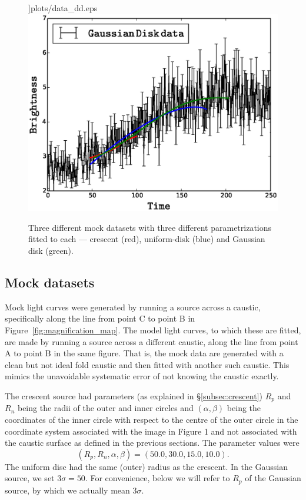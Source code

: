 \begin{figure}
                ]{plots/data_dd.eps}
\includegraphics[width=0.9\hsize,bb=0 0 576 432
                ]{plots/data_gg.eps}
\caption{\label{fig:mockdata} Three different mock datasets with
  three different parametrizations fitted to each --- crescent (red),
  uniform-disk (blue) and Gaussian disk (green).}
\end{figure}

\subsection{Mock datasets}

Mock light curves were generated by running a source across a
caustic, specifically along the line from point C to point B in
Figure~\ref{fig:magnification_map}.  The model light curves, to which
these are fitted, are made by running a source across a different
caustic, along the line from point A to point B in the same figure.
That is, the mock data are generated with a clean but not ideal fold
caustic and then fitted with another such caustic.  This mimics the
unavoidable systematic error of not knowing the caustic exactly.

The crescent source had parameters (as explained in
\S\ref{subsec:crescent}) $R_p$ and $R_n$ being the radii of the outer
and inner circles and $(\alpha,\beta)$ being the coordinates of the inner
circle with respect to the centre of the outer circle in the coordinate system associated with the image in Figure 1 and not associated 
with the caustic surface as defined in the previous sections.  The parameter values were
\begin{equation}
   (R_p, R_n, \alpha, \beta) = (50.0, 30.0, 15.0, 10.0).
\label{eqn:cp}
\end{equation}
The uniform disc had the same (outer) radius as the crescent.  In the
Gaussian source, we set $3\sigma=50$.  For convenience, below we will
refer to $R_p$ of the Gaussian source, by which we actually mean
$3\sigma$.

